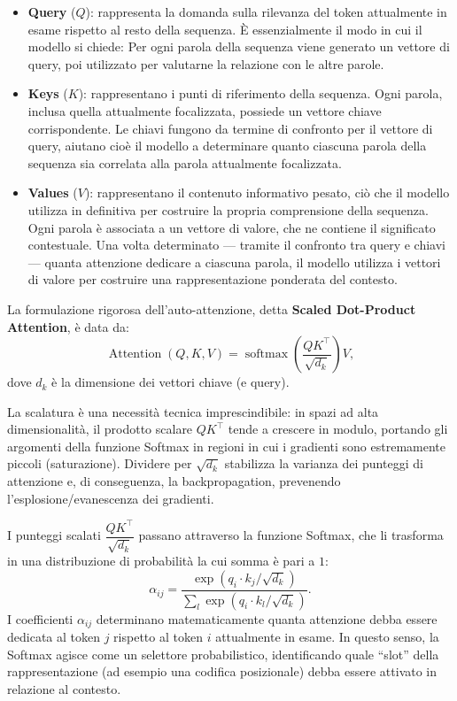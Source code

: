 \begin{itemize}
    \item \textbf{Query} ($Q$): rappresenta la domanda sulla rilevanza del token attualmente in esame rispetto al resto della sequenza. È essenzialmente il modo in cui il modello si chiede: Per ogni parola della sequenza viene generato un vettore di query, poi utilizzato per valutarne la relazione con le altre parole.

    \item \textbf{Keys} ($K$): rappresentano i punti di riferimento della sequenza. Ogni parola, inclusa quella attualmente focalizzata, possiede un vettore chiave corrispondente. Le chiavi fungono da termine di confronto per il vettore di query, aiutano cioè il modello a determinare quanto ciascuna parola della sequenza sia correlata alla parola attualmente focalizzata.

    \item \textbf{Values} ($V$): rappresentano il contenuto informativo pesato, ciò che il modello utilizza in definitiva per costruire la propria comprensione della sequenza. Ogni parola è associata a un vettore di valore, che ne contiene il significato contestuale. Una volta determinato — tramite il confronto tra query e chiavi — quanta attenzione dedicare a ciascuna parola, il modello utilizza i vettori di valore per costruire una rappresentazione ponderata del contesto.
\end{itemize}


La formulazione rigorosa dell'auto-attenzione, detta \textbf{Scaled Dot-Product Attention}, è data da:
\[
    \operatorname{Attention}(Q, K, V) = \operatorname{softmax}\!\left( \frac{Q K^{\top}}{\sqrt{d_k}} \right) V,
\]
dove $d_k$ è la dimensione dei vettori chiave (e query).

La scalatura è una necessità tecnica imprescindibile: in spazi ad alta dimensionalità, il prodotto scalare $Q K^{\top}$ tende a crescere in modulo, portando gli argomenti della funzione Softmax in regioni in cui i gradienti sono estremamente piccoli (saturazione). Dividere per $\sqrt{d_k}$ stabilizza la varianza dei punteggi di attenzione e, di conseguenza, la backpropagation, prevenendo l'esplosione/evanescenza dei gradienti.

I punteggi scalati $\dfrac{QK^{\top}}{\sqrt{d_k}}$ passano attraverso la funzione Softmax, che li trasforma in una distribuzione di probabilità la cui somma è pari a $1$:
\[
    \alpha_{ij} = \frac{\exp\!\left( q_i \cdot k_j / \sqrt{d_k} \right)}{\displaystyle\sum_{l} \exp\!\left( q_i \cdot k_l / \sqrt{d_k} \right)} .
\]
I coefficienti $\alpha_{ij}$ determinano matematicamente quanta attenzione debba essere dedicata al token $j$ rispetto al token $i$ attualmente in esame. In questo senso, la Softmax agisce come un selettore probabilistico, identificando quale ``slot'' della rappresentazione (ad esempio una codifica posizionale) debba essere attivato in relazione al contesto.


